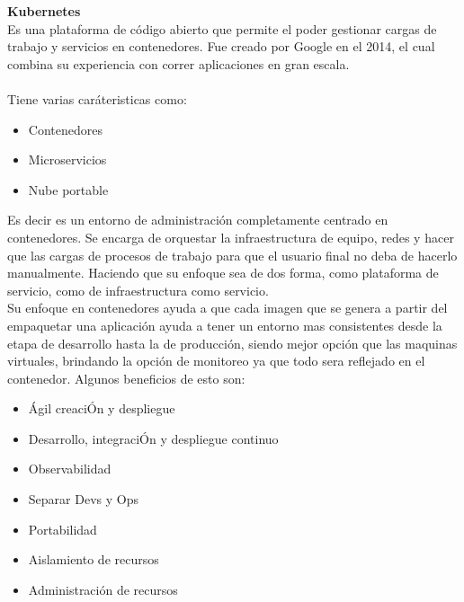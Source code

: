\documentclass[12pt]{article}
\begin{document}
\textbf{Kubernetes} \\
Es una plataforma de código abierto que permite el poder gestionar cargas de trabajo y servicios en contenedores. Fue creado por Google en el 2014, el cual combina su experiencia con correr aplicaciones en gran escala.
\\\\
Tiene varias caráteristicas como:
\begin{itemize}
    \item Contenedores
    \item Microservicios
    \item Nube portable
\end{itemize}
Es decir es un entorno de administración completamente centrado en contenedores. Se encarga de orquestar la infraestructura de equipo, redes y hacer que las cargas de procesos de trabajo para que el usuario final no deba de hacerlo manualmente. Haciendo que su enfoque sea de dos forma, como plataforma de servicio, como de infraestructura como servicio. 
\\
Su enfoque en contenedores ayuda a que cada imagen que se genera a partir del empaquetar una aplicación ayuda a tener un entorno mas consistentes desde la etapa de desarrollo hasta la de producción, siendo mejor opción que las maquinas virtuales, brindando la opción de monitoreo ya que todo sera reflejado en el contenedor. Algunos beneficios de esto son:
\begin{itemize}
    \item Ágil creaciÓn y despliegue
    \item Desarrollo, integraciÓn y despliegue continuo
    \item Observabilidad
    \item Separar Devs y Ops
    \item Portabilidad
    \item Aislamiento de recursos
    \item Administración de recursos
\end{itemize}
\end{document}
